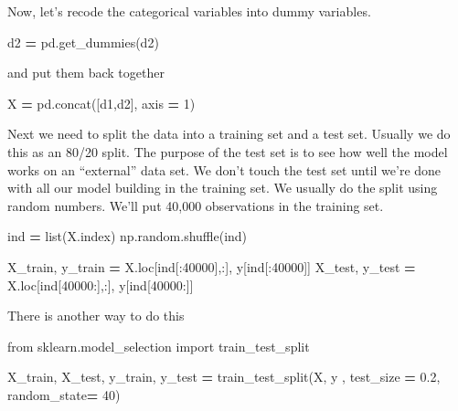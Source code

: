 \documentclass[
  letterpaper,
]{scrbook}
\newenvironment{Shaded}{\begin{snugshade}}{\end{snugshade}}
\newcommand{\BuiltInTok}[1]{#1}
\newcommand{\DecValTok}[1]{\textcolor[rgb]{0.00,0.00,0.81}{#1}}
\newcommand{\FloatTok}[1]{\textcolor[rgb]{0.00,0.00,0.81}{#1}}
\newcommand{\ImportTok}[1]{#1}
\newcommand{\NormalTok}[1]{#1}
\newcommand{\OperatorTok}[1]{\textcolor[rgb]{0.81,0.36,0.00}{\textbf{#1}}}
\begin{document}
Now, let's recode the categorical variables into dummy variables.

\begin{Shaded}
\begin{Highlighting}[]
\NormalTok{d2 }\OperatorTok{=}\NormalTok{ pd.get_dummies(d2)}
\end{Highlighting}
\end{Shaded}

and put them back together

\begin{Shaded}
\begin{Highlighting}[]
\NormalTok{X }\OperatorTok{=}\NormalTok{ pd.concat([d1,d2], axis }\OperatorTok{=} \DecValTok{1}\NormalTok{)}
\end{Highlighting}
\end{Shaded}

Next we need to split the data into a training set and a test set. Usually we do this as an 80/20 split.
The purpose of the test set is to see how well the model works on an ``external'' data set. We don't touch the
test set until we're done with all our model building in the training set. We usually do the split using
random numbers. We'll put 40,000 observations in the training set.

\begin{Shaded}
\begin{Highlighting}[]
\NormalTok{ind }\OperatorTok{=} \BuiltInTok{list}\NormalTok{(X.index)}
\NormalTok{np.random.shuffle(ind)}

\NormalTok{X_train, y_train }\OperatorTok{=}\NormalTok{ X.loc[ind[:}\DecValTok{40000}\NormalTok{],:], y[ind[:}\DecValTok{40000}\NormalTok{]]}
\NormalTok{X_test, y_test }\OperatorTok{=}\NormalTok{ X.loc[ind[}\DecValTok{40000}\NormalTok{:],:], y[ind[}\DecValTok{40000}\NormalTok{:]]}
\end{Highlighting}
\end{Shaded}

There is another way to do this

\begin{Shaded}
\begin{Highlighting}[]
\ImportTok{from}\NormalTok{ sklearn.model_selection }\ImportTok{import}\NormalTok{ train_test_split}

\NormalTok{X_train, X_test, y_train, y_test }\OperatorTok{=}\NormalTok{ train_test_split(X, y , test_size }\OperatorTok{=} \FloatTok{0.2}\NormalTok{, random_state}\OperatorTok{=} \DecValTok{40}\NormalTok{)}
\end{Highlighting}
\end{Shaded}
\end{document}
